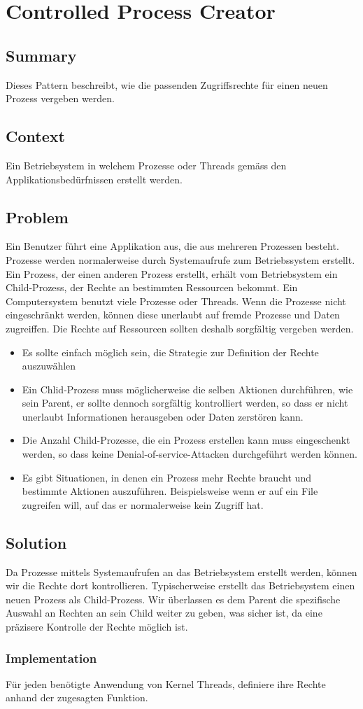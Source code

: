 \chapter{Controlled Process Creator}

\section{Summary}
Dieses Pattern beschreibt, wie die passenden Zugriffsrechte für einen neuen Prozess vergeben werden.

\section{Context}
Ein Betriebsystem in welchem Prozesse oder Threads gemäss den Applikationsbedürfnissen erstellt werden.

\section{Problem}
Ein Benutzer führt eine Applikation aus, die aus mehreren Prozessen besteht. Prozesse werden normalerweise durch Systemaufrufe zum Betriebssystem erstellt. Ein Prozess, der einen anderen Prozess erstellt, erhält vom Betriebsystem ein Child-Prozess, der Rechte an bestimmten Ressourcen bekommt. Ein Computersystem benutzt viele Prozesse oder Threads. Wenn die Prozesse nicht eingeschränkt werden, können diese unerlaubt auf fremde Prozesse und Daten zugreiffen. Die Rechte auf Ressourcen sollten deshalb sorgfältig vergeben werden.
\begin{itemize}
  \item Es sollte einfach möglich sein, die Strategie zur Definition der Rechte auszuwählen
  \item Ein Chlid-Prozess muss möglicherweise die selben Aktionen durchführen, wie sein Parent, er sollte dennoch sorgfältig kontrolliert werden, so dass er nicht unerlaubt Informationen herausgeben oder Daten zerstören kann.
  \item Die Anzahl Child-Prozesse, die ein Prozess erstellen kann muss eingeschenkt werden, so dass keine Denial-of-service-Attacken durchgeführt werden können.
  \item Es gibt Situationen, in denen ein Prozess mehr Rechte braucht und bestimmte Aktionen auszuführen. Beispielsweise wenn er auf ein File zugreifen will, auf das er normalerweise kein Zugriff hat.
\end{itemize}

\section{Solution}
Da Prozesse mittels Systemaufrufen an das Betriebsystem erstellt werden, können wir die Rechte dort kontrollieren. Typischerweise erstellt das Betriebsystem einen neuen Prozess als Child-Prozess. Wir überlassen es dem Parent die spezifische Auswahl an Rechten an sein Child weiter zu geben, was sicher ist, da eine präzisere Kontrolle der Rechte möglich ist.
\subsection{Implementation}
Für jeden benötigte Anwendung von Kernel Threads, definiere ihre Rechte anhand der zugesagten Funktion.

